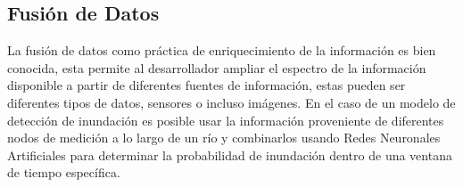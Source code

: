 \subsection{Fusión de Datos}

La fusión de datos como práctica de enriquecimiento de la información es bien conocida, esta permite al desarrollador ampliar el espectro de la información disponible a partir de diferentes fuentes de información, estas pueden ser diferentes tipos de datos, sensores o incluso imágenes. En el caso de un modelo de detección de inundación es posible usar la información proveniente de diferentes nodos de medición a lo largo de un río y combinarlos usando Redes Neuronales Artificiales para determinar la probabilidad de inundación dentro de una ventana de tiempo específica.